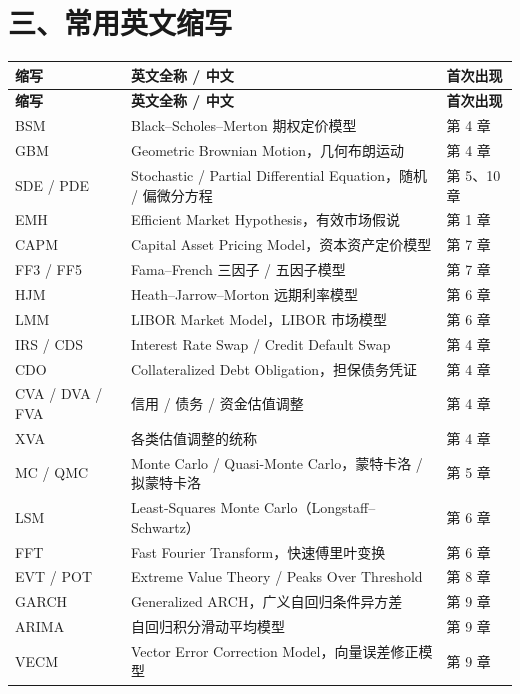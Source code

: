 \section*{三、常用英文缩写}

\vspace{0.3em}
{\tablefont
\begin{longtable}{@{}L{2.75cm}L{9.05cm}L{2.9cm}@{}}
\toprule
\textbf{缩写} & \textbf{英文全称 / 中文} & \textbf{首次出现} \\
\midrule
\endfirsthead
\toprule
\textbf{缩写} & \textbf{英文全称 / 中文} & \textbf{首次出现} \\
\midrule
\endhead
\bottomrule
\endlastfoot
BSM & Black--Scholes--Merton 期权定价模型 & 第 4 章 \\
GBM & Geometric Brownian Motion，几何布朗运动 & 第 4 章 \\
SDE / PDE & Stochastic / Partial Differential Equation，随机 / 偏微分方程 & 第 5、10 章 \\
EMH & Efficient Market Hypothesis，有效市场假说 & 第 1 章 \\
CAPM & Capital Asset Pricing Model，资本资产定价模型 & 第 7 章 \\
FF3 / FF5 & Fama--French 三因子 / 五因子模型 & 第 7 章 \\
HJM & Heath--Jarrow--Morton 远期利率模型 & 第 6 章 \\
LMM & LIBOR Market Model，LIBOR 市场模型 & 第 6 章 \\
IRS / CDS & Interest Rate Swap / Credit Default Swap & 第 4 章 \\
CDO & Collateralized Debt Obligation，担保债务凭证 & 第 4 章 \\
CVA / DVA / FVA & 信用 / 债务 / 资金估值调整 & 第 4 章 \\
XVA & 各类估值调整的统称 & 第 4 章 \\
MC / QMC & Monte Carlo / Quasi-Monte Carlo，蒙特卡洛 / 拟蒙特卡洛 & 第 5 章 \\
LSM & Least-Squares Monte Carlo（Longstaff--Schwartz） & 第 6 章 \\
FFT & Fast Fourier Transform，快速傅里叶变换 & 第 6 章 \\
EVT / POT & Extreme Value Theory / Peaks Over Threshold & 第 8 章 \\
GARCH & Generalized ARCH，广义自回归条件异方差 & 第 9 章 \\
ARIMA & 自回归积分滑动平均模型 & 第 9 章 \\
VECM & Vector Error Correction Model，向量误差修正模型 & 第 9 章 \\

\end{longtable}}
